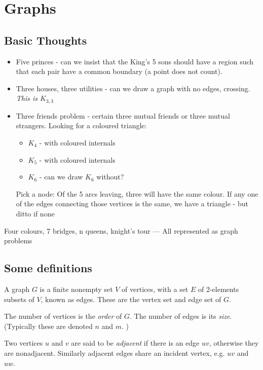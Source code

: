 \section{Graphs}
\label{title}

\subsection{Basic Thoughts}

\begin{itemize}
	\item Five princes - can we insist that the King’s 5 sons should have a region such that each pair have a common boundary (a point does not count). 
	\item Three houses, three utilities - can we draw a graph with no edges, crossing. \textit{This is $K_{3,3}$}
	\item Three friends problem -  certain three mutual friends or three mutual strangers. Looking for a coloured triangle: 
	\begin{itemize}
		\item $K_4$ - with coloured internals 
		\item $K_5$ - with coloured internals 
		\item $K_6$ - can we draw $K_6$ without?
		\end{itemize} 
	Pick a node: Of the 5 arcs leaving, three will have the same colour. 
	If any one of the edges connecting those vertices is the same, we have a triangle - but ditto if none 
	
\end{itemize}

Four colours, 7 bridges, n queens, knight’s tour --- All represented as graph problems 

\subsection{Some definitions}

A graph $G$ is a finite nonempty set $V$ of vertices, with a set $E$ of 2-elements subsets of $V$, known as edges. These are the vertex set and edge set of $G$. 

The number of vertices is the \textit{order} of $G$. The number of edges is its \textit{size}. (Typically these are denoted $n$ and $m$. )

Two vertices $u$ and $v$ are said to be \textit{adjacent} if there is an edge $uv$, otherwise they are nonadjacent. Similarly adjacent edges share an incident vertex, e.g. $uv$ and $uw$.

